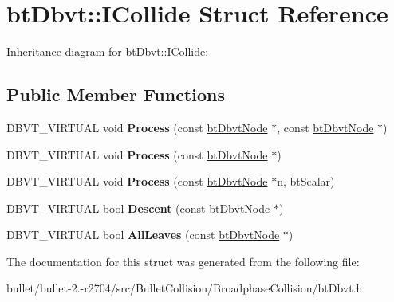 \hypertarget{structbt_dbvt_1_1_i_collide}{\section{bt\+Dbvt\+:\+:I\+Collide Struct Reference}
\label{structbt_dbvt_1_1_i_collide}
}


Inheritance diagram for bt\+Dbvt\+:\+:I\+Collide\+:
\subsection*{Public Member Functions}
\begin{DoxyCompactItemize}
\item 
\hypertarget{structbt_dbvt_1_1_i_collide_add579e95a283a4dd597ffe16a3f43873}{D\+B\+V\+T\+\_\+\+V\+I\+R\+T\+U\+A\+L void {\bfseries Process} (const \hyperlink{structbt_dbvt_node}{bt\+Dbvt\+Node} $\ast$, const \hyperlink{structbt_dbvt_node}{bt\+Dbvt\+Node} $\ast$)}\label{structbt_dbvt_1_1_i_collide_add579e95a283a4dd597ffe16a3f43873}

\item 
\hypertarget{structbt_dbvt_1_1_i_collide_a522ec74c39ae400f78e02dc41b0108ea}{D\+B\+V\+T\+\_\+\+V\+I\+R\+T\+U\+A\+L void {\bfseries Process} (const \hyperlink{structbt_dbvt_node}{bt\+Dbvt\+Node} $\ast$)}\label{structbt_dbvt_1_1_i_collide_a522ec74c39ae400f78e02dc41b0108ea}

\item 
\hypertarget{structbt_dbvt_1_1_i_collide_a93fd4e1906d747ae6b5cfc29ed165c9d}{D\+B\+V\+T\+\_\+\+V\+I\+R\+T\+U\+A\+L void {\bfseries Process} (const \hyperlink{structbt_dbvt_node}{bt\+Dbvt\+Node} $\ast$n, bt\+Scalar)}\label{structbt_dbvt_1_1_i_collide_a93fd4e1906d747ae6b5cfc29ed165c9d}

\item 
\hypertarget{structbt_dbvt_1_1_i_collide_aad761bca654e99885bdd942df330ed9a}{D\+B\+V\+T\+\_\+\+V\+I\+R\+T\+U\+A\+L bool {\bfseries Descent} (const \hyperlink{structbt_dbvt_node}{bt\+Dbvt\+Node} $\ast$)}\label{structbt_dbvt_1_1_i_collide_aad761bca654e99885bdd942df330ed9a}

\item 
\hypertarget{structbt_dbvt_1_1_i_collide_a4a257177db9d370222d539479cc87749}{D\+B\+V\+T\+\_\+\+V\+I\+R\+T\+U\+A\+L bool {\bfseries All\+Leaves} (const \hyperlink{structbt_dbvt_node}{bt\+Dbvt\+Node} $\ast$)}\label{structbt_dbvt_1_1_i_collide_a4a257177db9d370222d539479cc87749}

\end{DoxyCompactItemize}


The documentation for this struct was generated from the following file\+:\begin{DoxyCompactItemize}
\item 
bullet/bullet-\/2.-\/r2704/src/\+Bullet\+Collision/\+Broadphase\+Collision/bt\+Dbvt.\+h\end{DoxyCompactItemize}
